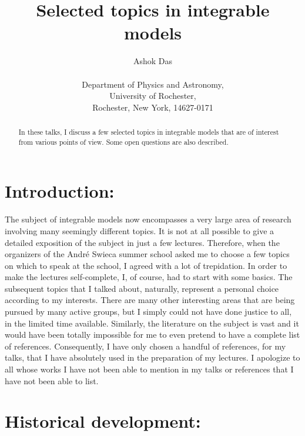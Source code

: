 \documentclass[a4paper,11pt]{article}
\begin{document}
\title{ 
{\bf Selected topics in integrable models}} 
\author{Ashok Das \\
\\
Department of Physics and Astronomy, \\
University of Rochester,\\
Rochester, New York, 14627-0171}
\date{}
\maketitle


\begin{abstract}

In these talks, I discuss a few selected topics in integrable models that
are of interest from various points of view. Some open questions are
also described. 
\end{abstract}

\vfill\eject
\section{Introduction:}

The subject of integrable models now encompasses a very large area of
research involving many seemingly different topics. It is not at all
possible to give a detailed exposition of the subject in just a few
lectures. Therefore, when the organizers of the Andr\'{e} Swieca
summer school asked me to choose a few topics on which to speak at the
school, I agreed with a lot of trepidation. In order to make the
lectures self-complete, I, of course, had to start with some
basics. The subsequent topics that I talked about, naturally, represent
a personal choice according to my interests. There are many other interesting
areas that are being pursued by many active groups, but I simply could
not have done justice to all, in the limited time available. Similarly,
the literature on the subject is vast and it would have been totally
impossible for me to even pretend to have a complete list of
references. Consequently, I have only chosen a handful of references,
for my talks, that I have absolutely used in the preparation of my
lectures. I apologize to all whose works I have not been able to mention
in my talks or references that I have not been able to list.

\section{Historical development:}
\end{document}
